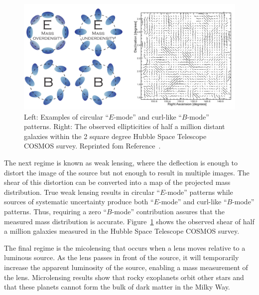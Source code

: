 \begin{figure}[htbp]
  \centering
  \includegraphics[width=\textwidth]{DarkMatter/Figures/weak_lensing.png}
  \caption{
    Left: Examples of circular ``$E$-mode'' and curl-like ``$B$-mode'' patterns.
    Right: The observed ellipticities of half a million distant galaxies within the 2 square degree Hubble Space Telescope COSMOS survey.
    Reprinted fom Reference~\cite{}. %
  }
  \label{fig:weak_lensing}
\end{figure}

The next regime is known as weak lensing, where the deflection is enough to distort the image of the source but not enough to result in multiple images.
The shear of this distortion can be converted into a map of the projected mass distribution.
True weak lensing results in circular ``$E$-mode'' patterns while sources of systematic uncertainty produce both ``$E$-mode'' and curl-like ``$B$-mode'' patterns.
Thus, requiring a zero ``$B$-mode'' contribution assures that the measured mass distribution is accurate.
Figure~\ref{fig:weak_lensing} shows the observed shear of half a million galaxies measured in the Hubble Space Telescope COSMOS survey.

The final regime is the micolensing that occurs when a lens moves relative to a luminous source.
As the lens passes in front of the source, it will temporarily increase the apparent luminosity of the source, enabling a mass measurement of the lens.
Microlensing results show that rocky exoplanets orbit other stars and that these planets cannot form the bulk of dark matter in the Milky Way.


